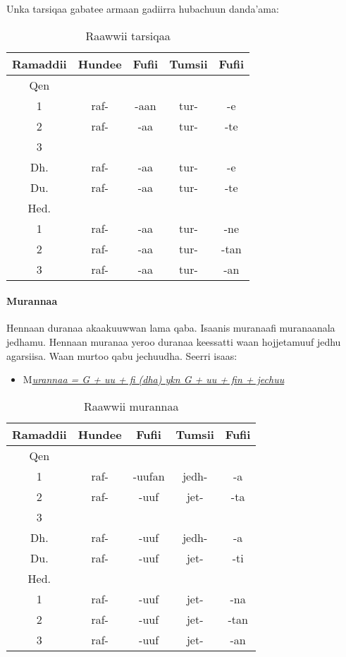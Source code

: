 \documentclass[11pt,b5paper]{book}
\begin{document}
Unka tarsiqaa gabatee armaan gadiirra hubachuun danda'ama:
\begin{table}[H]
	\centering
	\caption{Raawwii tarsiqaa}
	\begin{tabular}{ccccc}
		\hline\hline
		Ramaddii & Hundee & Fufii & Tumsii & Fufii \\
		\hline
		Qen &  &  &  &  \\
		1	& raf- & -aan & tur- & -e		\\
		2	& raf- & -aa & tur- & -te	\\
		3 \\
		Dh.	& raf- & -aa & tur- & -e		\\
		Du.	& raf- & -aa & tur- & -te		\\
		\hline
		Hed. \\
		1   & raf- & -aa & tur- & -ne    \\
		2   & raf- & -aa & tur- & -tan     \\
		3   & raf- & -aa & tur- & -an     \\
		\hline
		
	\end{tabular}
\end{table}

\paragraph{Murannaa}

Hennaan duranaa akaakuuwwan lama qaba. Isaanis muranaafi muranaanala jedhamu. Hennaan muranaa yeroo duranaa
keessatti waan hojjetamuuf jedhu agarsiisa. Waan murtoo qabu jechuudha. Seerri isaas: 
\begin{itemize}
	\item M\textit{\underline{urannaa = G + uu + fi (dha) ykn G + uu + fin + jechuu }}
\end{itemize}

\begin{table}[H]
	\centering
	\caption{Raawwii murannaa}
	\begin{tabular}{ccccc}
		\hline\hline
		Ramaddii & Hundee & Fufii & Tumsii & Fufii \\
		\hline
		Qen &  &  &  &  \\
		1	& raf- & -uufan & jedh- & -a		\\
		2	& raf- & -uuf & jet- & -ta	\\
		3 \\
		Dh.	& raf- & -uuf & jedh- & -a	\\
		Du.	& raf- & -uuf & jet- & -ti	\\
		\hline
		Hed. \\
		1   & raf- & -uuf & jet- & -na   \\
		2   & raf- & -uuf & jet- & -tan     \\
		3   & raf- & -uuf & jet- & -an     \\
		\hline
	\end{tabular}
\end{table}
\end{document}
